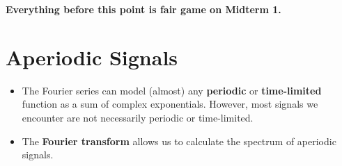 \documentclass[10pt]{article}
\begin{document}
\textbf{Everything before this point is fair game on Midterm 1.}\\

\section*{Aperiodic Signals}
\begin{itemize}
    \item The Fourier series can model (almost) any \textbf{periodic} or \textbf{time-limited} function as a sum of complex exponentials.  However, most signals we encounter are not necessarily periodic or time-limited.
    \item The \textbf{Fourier transform} allows us to calculate the spectrum of aperiodic signals.
\end{itemize}
\end{document}
